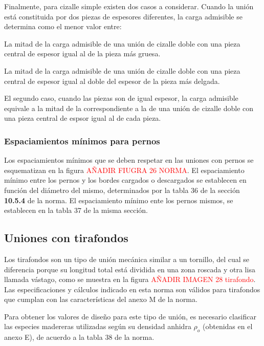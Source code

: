 Finalmente, para cizalle simple existen dos casos a considerar. Cuando la unión está constituida por dos piezas de espesores diferentes, la carga admisible se determina como el menor valor entre:
\begin{itemize*}
	\item La mitad de la carga admisible de una unión de cizalle doble con una pieza central de espesor igual al de la pieza más gruesa.
	\item La mitad de la carga admisible de una unión de cizalle doble con una pieza central de espesor igual al doble del espesor de la pieza más delgada.
\end{itemize*}
El segundo caso, cuando las piezas son de igual espesor, la carga admisible equivale a la mitad de la correspondiente a la de una unión de cizalle doble con una pieza central de espsor igual al de cada pieza.

\subsubsection{Espaciamientos mínimos para pernos}
\label{sec:espaciamiento_pernos}
Los espaciamientos mínimos que se deben respetar en las uniones con pernos se esquematizan en la figura \textcolor{red}{AÑADIR FIUGRA 26 NORMA}. El espaciamiento mínimo entre los pernos y los bordes cargados o descargados se establecen en función del diámetro del mismo, determinados por la tabla 36 de la sección \textbf{10.5.4} de la norma. El espaciamiento mínimo ente los pernos mismos, se establecen en la tabla 37 de la misma sección. 

\subsection{Uniones con tirafondos}
\label{sec:tirafondos}
Los tirafondos son un tipo de unión mecánica similar a un tornillo, del cual se diferencia porque su longitud total está dividida en una zona roscada y otra lisa llamada vástago, como se muestra en la figura \textcolor{red}{AÑADIR IMAGEN 28 tirafondo}. Las especificaciones y cálculos indicado en esta norma son válidos para tirafondos que cumplan con las características del anexo M de la norma.

Para obtener los valores de diseño para este tipo de unión, es necesario clasificar las especies madereras utilizadas según su densidad anhidra $\rho_o$ (obtenidas en el anexo E), de acuerdo a la tabla 38 de la norma.

